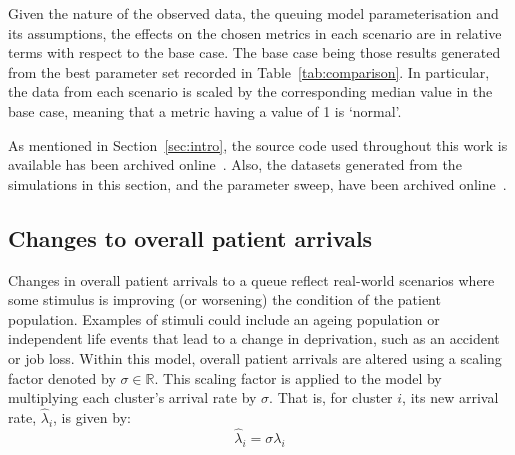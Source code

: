 \documentclass[11pt]{article}
\begin{document}
Given the nature of the observed data, the queuing model parameterisation and
its assumptions, the effects on the chosen metrics in each scenario are in
relative terms with respect to the base case. The base case being those results
generated from the best parameter set recorded in Table~\ref{tab:comparison}. In
particular, the data from each scenario is scaled by the corresponding median
value in the base case, meaning that a metric having a value of 1 is ‘normal’.

As mentioned in Section~\ref{sec:intro}, the source code used throughout this
work is available has been archived online~\cite{Wilde2020github}. Also, the
datasets generated from the simulations in this section, and the parameter
sweep, have been archived online~\cite{Wilde2020results}.

\subsection{Changes to overall patient arrivals}\label{subsec:arrivals}

Changes in overall patient arrivals to a queue reflect real-world scenarios
where some stimulus is improving (or worsening) the condition of the patient
population. Examples of stimuli could include an ageing population or
independent life events that lead to a change in deprivation, such as an
accident or job loss. Within this model, overall patient arrivals are altered
using a scaling factor denoted by \(\sigma\in\mathbb{R}\). This scaling factor
is applied to the model by multiplying each cluster's arrival rate by
\(\sigma\). That is, for cluster \(i\), its new arrival rate, \(\hat\lambda_i\),
is given by:
\begin{equation}\label{eq:lambda}
    \hat\lambda_{i} = \sigma\lambda_i
\end{equation}
\end{document}
